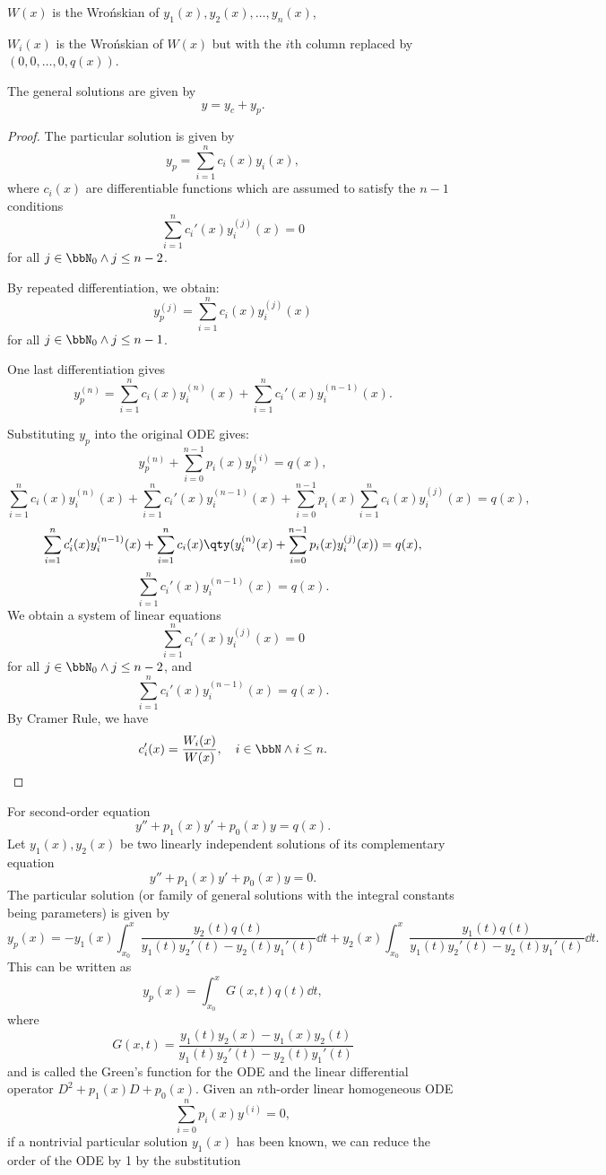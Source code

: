 \documentclass[a4paper,12pt]{report}
\begin{document}
\item $W(x)$ is the Wrońskian of $y_1(x),y_2(x),\ldots,y_n(x)$,
\item $W_i(x)$ is the Wrońskian of $W(x)$ but with the $i$th column replaced by $(0,0,\ldots,0,q(x))$.
\eit
\item The general solutions are given by
\[y=y_c+y_p.\]
\een
\begin{proof}
The particular solution is given by
\[y_p=\sum_{i=1}^nc_i(x)y_i(x),\]
where $c_i(x)$ are differentiable functions which are assumed to satisfy the $n-1$ conditions
\[\sum_{i=1}^nc_i'(x)y_i^{(j)}(x)=0\]
for all $j\in\bbN_0\land j\leq n-2$.

By repeated differentiation, we obtain:
\[y_p^{(j)}=\sum_{i=1}^nc_i(x)y_i^{(j)}(x)\]
for all $j\in\bbN_0\land j\leq n-1$.

One last differentiation gives
\[y_p^{(n)}=\sum_{i=1}^nc_i(x)y_i^{(n)}(x)+\sum_{i=1}^nc_i'(x)y_i^{(n-1)}(x).\]

Substituting $y_p$ into the original ODE gives:
\[y_p^{(n)}+\sum_{i=0}^{n-1}p_i(x)y_p^{(i)}=q(x),\]
\[\sum_{i=1}^nc_i(x)y_i^{(n)}(x)+\sum_{i=1}^nc_i'(x)y_i^{(n-1)}(x)+\sum_{i=0}^{n-1}p_i(x)\sum_{i=1}^nc_i(x)y_i^{(j)}(x)=q(x),\]
\[\sum_{i=1}^nc_i'(x)y_i^{(n-1)}(x)+\sum_{i=1}^nc_i(x)\qty(y_i^{(n)}(x)+\sum_{i=0}^{n-1}p_i(x)y_i^{(j)}(x))=q(x),\]
\[\sum_{i=1}^nc_i'(x)y_i^{(n-1)}(x)=q(x).\]
We obtain a system of linear equations
\[\sum_{i=1}^nc_i'(x)y_i^{(j)}(x)=0\]
for all $j\in\bbN_0\land j\leq n-2$, and
\[\sum_{i=1}^nc_i'(x)y_i^{(n-1)}(x)=q(x).\]
By Cramer Rule, we have
\[c_i'(x)=\frac{W_i(x)}{W(x)},\quad i\in\bbN\land i\leq n.\]
\end{proof}
For second-order equation
\[y''+p_1(x)y'+p_0(x)y=q(x).\]
Let $y_1(x),y_2(x)$ be two linearly independent solutions of its complementary equation
\[y''+p_1(x)y'+p_0(x)y=0.\]
The particular solution (or family of general solutions with the integral constants being parameters) is given by
\[y_p(x)=-y_1(x)\int_{x_0}^x\frac{y_2(t)q(t)}{y_1(t)y_2'(t)-y_2(t)y_1'(t)}\dd{t}+y_2(x)\int_{x_0}^x\frac{y_1(t)q(t)}{y_1(t)y_2'(t)-y_2(t)y_1'(t)}\dd{t}.\]
This can be written as
\[y_p(x)=\int_{x_0}^xG(x,t)q(t)\dd{t},\]
where
\[G(x,t)=\frac{y_1(t)y_2(x)-y_1(x)y_2(t)}{y_1(t)y_2'(t)-y_2(t)y_1'(t)}\]
and is called the Green's function for the ODE and the linear differential operator $D^2+p_1(x)D+p_0(x)$.
Given an $n$th-order linear homogeneous ODE
\[\sum_{i=0}^np_i(x)y^{(i)}=0,\]
if a nontrivial particular solution $y_1(x)$ has been known, we can reduce the order of the ODE by 1 by the substitution
\end{document}
